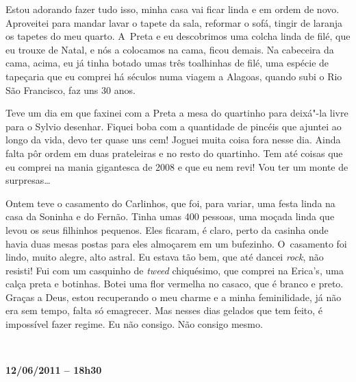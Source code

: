 Estou adorando fazer tudo isso, minha casa vai ficar linda e em ordem de
novo. Aproveitei para mandar lavar o tapete da sala, reformar o sofá,
tingir de laranja os tapetes do meu quarto. A~Preta e eu descobrimos uma
colcha linda de filé, que eu trouxe de Natal, e nós a colocamos na cama,
ficou demais. Na cabeceira da cama, acima, eu já tinha botado umas três
toalhinhas de filé, uma espécie de tapeçaria que eu comprei há séculos
numa viagem a Alagoas, quando subi o Rio São Francisco, faz uns 30 anos.

Teve um dia em que faxinei com a Preta a mesa do quartinho para deixá"-la
livre para o Sylvio desenhar. Fiquei boba com a quantidade de pincéis
que ajuntei ao longo da vida, devo ter quase uns cem! Joguei muita coisa
fora nesse dia. Ainda falta pôr ordem em duas prateleiras e no resto do
quartinho. Tem até coisas que eu comprei na mania gigantesca de 2008 e
que eu nem revi! Vou ter um monte de surpresas…

Ontem teve o casamento do Carlinhos, que foi, para variar, uma festa
linda na casa da Soninha e do Fernão. Tinha umas 400 pessoas, uma moçada
linda que levou os seus filhinhos pequenos. Eles ficaram, é claro, perto
da casinha onde havia duas mesas postas para eles almoçarem em um
bufezinho. O~casamento foi lindo, muito alegre, alto astral. Eu estava
tão bem, que até dancei \emph{rock}, não resisti! Fui com um casquinho
de \emph{tweed} chiquésimo, que comprei na Erica's, uma calça preta e
botinhas. Botei uma flor vermelha no casaco, que é branco e preto.
Graças a Deus, estou recuperando o meu charme e a minha feminilidade, já
não era sem tempo, falta só emagrecer. Mas nesses dias gelados que tem
feito, é impossível fazer regime. Eu não consigo. Não consigo mesmo.

\begin{center}\asterisc{}​\end{center}


\begin{flushright}\textbf{12/06/2011 -- 18h30}\end{flushright}


